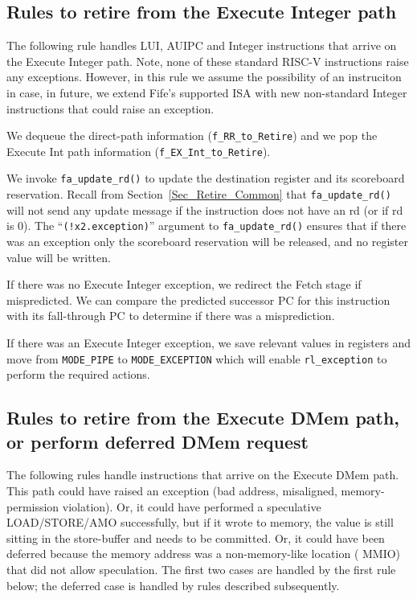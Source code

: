 
\subsection{Rules to retire from the Execute Integer path}

\label{Sec_Fife_Retire_Int}

The following rule handles LUI, AUIPC and Integer instructions that
arrive on the Execute Integer path.  Note, none of these standard
RISC-V instructions raise any exceptions.  However, in this rule we
assume the possibility of an instruciton in case, in future, we extend
Fife's supported ISA with new non-standard Integer instructions that
could raise an exception.



We dequeue the direct-path information (\verb|f_RR_to_Retire|) and we
pop the Execute Int path information (\verb|f_EX_Int_to_Retire|).

We invoke \verb|fa_update_rd()| to update the destination register and
its scoreboard reservation.  Recall from
Section~\ref{Sec_Retire_Common} that \verb|fa_update_rd()| will not
send any update message if the instruction does not have an rd (or if
rd is 0).  The ``\verb|(!x2.exception)|'' argument to
\verb|fa_update_rd()| ensures that if there was an exception only the
scoreboard reservation will be released, and no register value will be
written.

If there was no Execute Integer exception, we redirect the Fetch stage
if mispredicted.  We can compare the predicted successor PC for this
instruction with its fall-through PC to determine if there was a
misprediction.

If there was an Execute Integer exception, we save relevant values in
registers and move from \verb|MODE_PIPE| to \verb|MODE_EXCEPTION|
which will enable \verb|rl_exception| to perform the required actions.


\subsection{Rules to retire from the Execute DMem path, or perform deferred DMem request}

\label{Sec_Fife_S5_DMem}

The following rules handle instructions that arrive on the Execute
DMem path.  This path could have raised an exception (bad address,
misaligned, memory-permission violation).  Or, it could have performed
a speculative LOAD/STORE/AMO successfully, but if it wrote to memory,
the value is still sitting in the store-buffer and needs to be
committed.  Or, it could have been deferred because the memory address
was a non-memory-like location ({\eg} MMIO) that did not allow
speculation.  The first two cases are handled by the first rule below;
the deferred case is handled by rules described subsequently.

